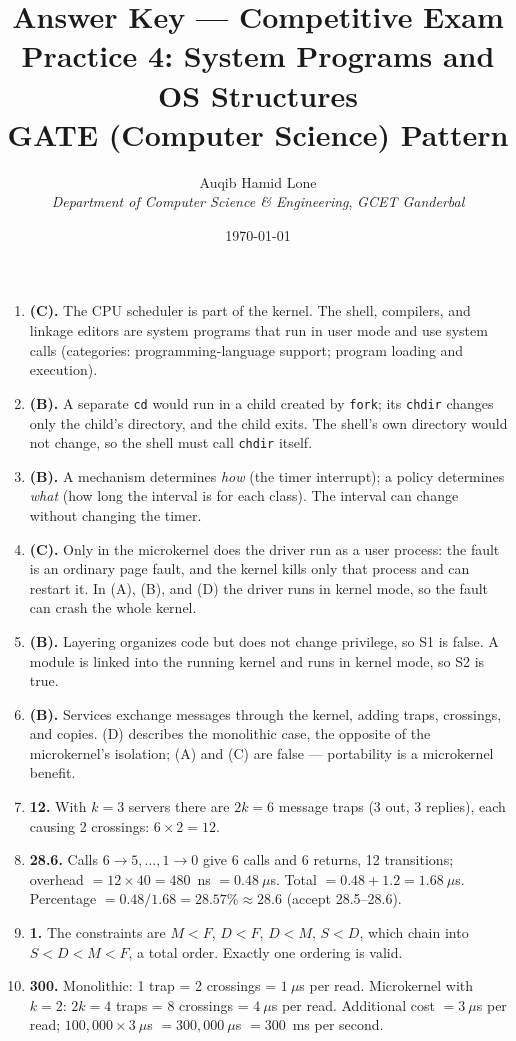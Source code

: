 \documentclass[11pt]{article}
\title{Answer Key --- Competitive Exam Practice 4: System Programs and OS Structures\\\large GATE (Computer Science) Pattern}
\author{Auqib Hamid Lone\\[0.3em]
  \emph{Department of Computer Science \& Engineering}, \emph{GCET Ganderbal}}
\date{\today}
\begin{document}
\maketitle

\begin{enumerate}
\item[\textbf{Q1}] \textbf{(C).} The CPU scheduler is part of the kernel. The shell, compilers, and linkage editors are system programs that run in user mode and use system calls (categories: programming-language support; program loading and execution).

\item[\textbf{Q2}] \textbf{(B).} A separate \texttt{cd} would run in a child created by \texttt{fork}; its \texttt{chdir} changes only the child's directory, and the child exits. The shell's own directory would not change, so the shell must call \texttt{chdir} itself.

\item[\textbf{Q3}] \textbf{(B).} A mechanism determines \emph{how} (the timer interrupt); a policy determines \emph{what} (how long the interval is for each class). The interval can change without changing the timer.

\item[\textbf{Q4}] \textbf{(C).} Only in the microkernel does the driver run as a user process: the fault is an ordinary page fault, and the kernel kills only that process and can restart it. In (A), (B), and (D) the driver runs in kernel mode, so the fault can crash the whole kernel.

\item[\textbf{Q5}] \textbf{(B).} Layering organizes code but does not change privilege, so S1 is false. A module is linked into the running kernel and runs in kernel mode, so S2 is true.

\item[\textbf{Q6}] \textbf{(B).} Services exchange messages through the kernel, adding traps, crossings, and copies. (D) describes the monolithic case, the opposite of the microkernel's isolation; (A) and (C) are false --- portability is a microkernel benefit.

\item[\textbf{Q7}] \textbf{12.} With $k=3$ servers there are $2k = 6$ message traps (3 out, 3 replies), each causing 2 crossings: $6 \times 2 = 12$.

\item[\textbf{Q8}] \textbf{28.6.} Calls $6\to5,\dots,1\to0$ give 6 calls and 6 returns, 12 transitions; overhead $= 12 \times 40 = 480$~ns $= 0.48~\mu$s. Total $= 0.48 + 1.2 = 1.68~\mu$s. Percentage $= 0.48/1.68 = 28.57\% \approx 28.6$ (accept 28.5--28.6).

\item[\textbf{Q9}] \textbf{1.} The constraints are $M<F$, $D<F$, $D<M$, $S<D$, which chain into $S < D < M < F$, a total order. Exactly one ordering is valid.

\item[\textbf{Q10}] \textbf{300.} Monolithic: 1 trap = 2 crossings = $1~\mu$s per read. Microkernel with $k=2$: $2k=4$ traps = 8 crossings = $4~\mu$s per read. Additional cost $= 3~\mu$s per read; $100{,}000 \times 3~\mu$s $= 300{,}000~\mu$s $= 300$~ms per second.
\end{enumerate}
\end{document}
